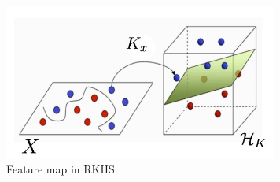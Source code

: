 \begin{figure}[htpb!]
\centering
\includegraphics[width=90mm]{img/featuremaphilbert.jpg}
\caption{Feature map in RKHS}
\label{overflow}
\end{figure}



